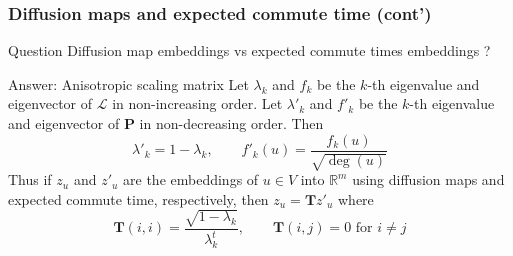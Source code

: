 \documentclass[professionalfonts, hyperref={pdfpagelabels=false,
  colorlinks=true, linkcolor=purple}]{beamer}
\begin{document}
\begin{frame}
  \frametitle{Diffusion maps and expected commute time (cont')}
    \begin{alertblock}{Question}
      Diffusion map embeddings vs expected commute times embeddings ?
    \end{alertblock}
    \begin{exampleblock}{Answer: Anisotropic scaling matrix}
      Let $\lambda_k$ and $f_k$ be the $k$-th eigenvalue and
      eigenvector of $\mathcal{L}$ in non-increasing order. Let
      $\lambda'_{k}$ and $f'_k$ be the $k$-th eigenvalue and
      eigenvector of $\bm{P}$ in non-decreasing order. Then
      \begin{equation}
        \label{eq:16}
        \lambda'_k = 1 - \lambda_{k}, \qquad 
        f'_k(u) = \frac{f_k(u)}{\sqrt{\deg(u)}}
      \end{equation}
      Thus if $z_u$ and $z'_u$ are the embeddings of $u \in V$ into
      $\mathbb{R}^{m}$ using diffusion maps and expected commute
      time, respectively, then $z_u = \bm{T} z'_u$
      where 
      \begin{equation}
        \label{eq:18}
        \bm{T}(i,i) = \frac{\sqrt{1 - \lambda_k}}{\lambda_k^{t}},
        \qquad \bm{T}(i,j) = 0 \,\, \text{for $i \not= j$}
      \end{equation}
    \end{exampleblock}
\end{frame}
\end{document}
